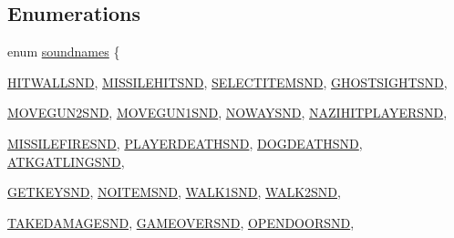 \subsection*{Enumerations}
\begin{DoxyCompactItemize}
\item 
enum \hyperlink{AUDIOWL6_8H_a4a3d02bfe7b02201dbba1993b77ae7e1}{soundnames} \{ \par
\hyperlink{AUDIOSDM_8H_a4a3d02bfe7b02201dbba1993b77ae7e1a821a759b2bb5bfe1b4990f3f74143ab4}{HITWALLSND}, 
\hyperlink{AUDIOSDM_8H_a4a3d02bfe7b02201dbba1993b77ae7e1a77e4c92ae808a64bda5e6aef23e48a2d}{MISSILEHITSND}, 
\hyperlink{AUDIOSDM_8H_a4a3d02bfe7b02201dbba1993b77ae7e1a5e717a921e21640d8a70ea79aaae49dd}{SELECTITEMSND}, 
\hyperlink{AUDIOSDM_8H_a4a3d02bfe7b02201dbba1993b77ae7e1aa2014a7b9253b4ea9c089b2147e37533}{GHOSTSIGHTSND}, 
\par
\hyperlink{AUDIOSDM_8H_a4a3d02bfe7b02201dbba1993b77ae7e1ab664b57e05c879121eca90691a0af681}{MOVEGUN2SND}, 
\hyperlink{AUDIOSDM_8H_a4a3d02bfe7b02201dbba1993b77ae7e1a5f8d221709f96e9b901d65ff5726ae4a}{MOVEGUN1SND}, 
\hyperlink{AUDIOSDM_8H_a4a3d02bfe7b02201dbba1993b77ae7e1a5b58998ffdf72bb8a9e8e6e4bd0415c7}{NOWAYSND}, 
\hyperlink{AUDIOSDM_8H_a4a3d02bfe7b02201dbba1993b77ae7e1a2395cd65fbce553be6826de621acd46e}{NAZIHITPLAYERSND}, 
\par
\hyperlink{AUDIOSDM_8H_a4a3d02bfe7b02201dbba1993b77ae7e1a2487014d04b72f2a2da4f28a8209afc7}{MISSILEFIRESND}, 
\hyperlink{AUDIOSDM_8H_a4a3d02bfe7b02201dbba1993b77ae7e1a90f10382b9805978705f2869bf95542f}{PLAYERDEATHSND}, 
\hyperlink{AUDIOSDM_8H_a4a3d02bfe7b02201dbba1993b77ae7e1a0d6de1166434f72da9a0778e040125ae}{DOGDEATHSND}, 
\hyperlink{AUDIOSDM_8H_a4a3d02bfe7b02201dbba1993b77ae7e1ad99e9f625f001dcb9801f670b452eddc}{ATKGATLINGSND}, 
\par
\hyperlink{AUDIOSDM_8H_a4a3d02bfe7b02201dbba1993b77ae7e1a5ae0ad53623d4c9dc2966911f8176464}{GETKEYSND}, 
\hyperlink{AUDIOSDM_8H_a4a3d02bfe7b02201dbba1993b77ae7e1aa8f3ed9d5e6336dd19e225ca66ff7e62}{NOITEMSND}, 
\hyperlink{AUDIOSDM_8H_a4a3d02bfe7b02201dbba1993b77ae7e1a3f582460f6e9b2af410e2ae129a920c7}{WALK1SND}, 
\hyperlink{AUDIOSDM_8H_a4a3d02bfe7b02201dbba1993b77ae7e1a9f295ebcf48ca21cf8d996bdfea4d197}{WALK2SND}, 
\par
\hyperlink{AUDIOSDM_8H_a4a3d02bfe7b02201dbba1993b77ae7e1af3ee05a179483381b2acafe47f109d90}{TAKEDAMAGESND}, 
\hyperlink{AUDIOSDM_8H_a4a3d02bfe7b02201dbba1993b77ae7e1a066f7483434b8d363b2b3b5100de2f80}{GAMEOVERSND}, 
\hyperlink{AUDIOSDM_8H_a4a3d02bfe7b02201dbba1993b77ae7e1a5ff0c3c866acb8f9794db972ec11b23e}{OPENDOORSND}, 

\end{DoxyCompactItemize}
